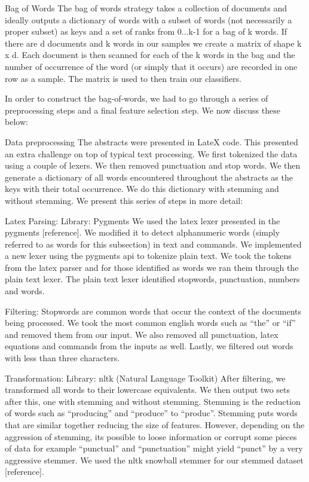 \documentclass{acm_proc_article-sp}
\begin{document}
Bag of Words
The bag of words strategy takes a collection of documents and ideally outputs a dictionary of words with a subset of words (not necessarily a proper subset) as keys and a set of ranks from 0...k-1 for a bag of k words. If there are d documents and k words in our samples we create a matrix of shape k x d. Each document  is then scanned for each of the k words in the bag and the number of occurrence of the word (or simply that it occurs)  are recorded in one row as a sample. The matrix is used to then train our classifiers.

In order to construct the bag-of-words, we had to go through a series of preprocessing steps and a final feature selection step. We now discuss these below: 

Data preprocessing
The abstracts were presented in LateX code. This presented an extra challenge on top of typical text processing. We first tokenized the data using a couple of lexers. We then removed punctuation and stop words. We then generate a dictionary of all words encountered throughout the abstracts as the keys with their total occurrence. We do this dictionary with stemming and without stemming. We present this series of steps in more detail: 

Latex Parsing:
Library: Pygments 
We used the latex lexer presented in the pygments [reference]. We modified it to detect alphanumeric words (simply referred to as words for this subsection) in text and commands. We implemented a new lexer using the pygments api to tokenize plain text. We took the tokens from the latex parser and for those identified as words we ran them through the plain text lexer. The plain text lexer identified stopwords, punctuation, numbers and words. 

Filtering: 
Stopwords are common words that occur the context of the documents being processed. We took the most common english words such as “the” or “if” and removed them from our input. We also removed all punctuation, latex equations and commands from the inputs as well. Lastly, we filtered out words with less than three characters. 

Transformation: 
Library: nltk (Natural Language Toolkit) 
After filtering, we transformed all words to their lowercase equivalents. We then output two sets after this, one with stemming and without stemming. Stemming is the reduction of words such as “producing”  and “produce” to “produc”. Stemming puts words that are similar together reducing the size of features. However, depending on the aggression of stemming, its possible to loose information or corrupt some pieces of data for example “punctual” and “punctuation” might yield “punct” by a very aggressive stemmer. We used the nltk snowball stemmer for our stemmed dataset [reference].
\end{document}
